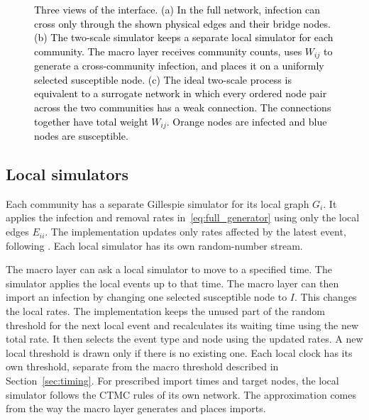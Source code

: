 \begin{figure}[tbp]
\caption{\textcolor{black}{Three views of the interface. (a) In the full network, infection can cross only through the shown physical edges and their bridge nodes. (b) The two-scale simulator keeps a separate local simulator for each community. The macro layer receives community counts, uses $W_{ij}$ to generate a cross-community infection, and places it on a uniformly selected susceptible node. (c) The ideal two-scale process is equivalent to a surrogate network in which every ordered node pair across the two communities has a weak connection. The connections together have total weight $W_{ij}$. Orange nodes are infected and blue nodes are susceptible.}}
\label{fig:schematic}
\end{figure}

\subsection{Local simulators}
\label{sec:local}

Each community has a separate Gillespie simulator for its local graph $G_i$. It applies the infection and removal rates in~\eqref{eq:full_generator} using only the local edges $E_{ii}$. The implementation updates only rates affected by the latest event, following \citet{kuryliak2025simulating}. Each local simulator has its own random-number stream.

The macro layer can ask a local simulator to move to a specified time. The simulator applies the local events up to that time. The macro layer can then import an infection by changing one selected susceptible node to $I$. This changes the local rates. The implementation keeps the unused part of the random threshold for the next local event and recalculates its waiting time using the new total rate. It then selects the event type and node using the updated rates. A new local threshold is drawn only if there is no existing one. Each local clock has its own threshold, separate from the macro threshold described in Section~\ref{sec:timing}. For prescribed import times and target nodes, the local simulator follows the CTMC rules of its own network. The approximation comes from the way the macro layer generates and places imports.

